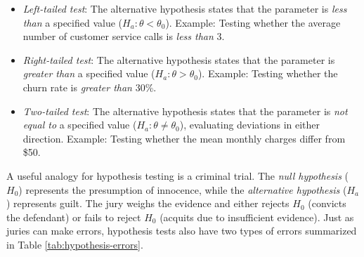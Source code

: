 \documentclass[
  11pt,
]{book}
\providecommand{\tightlist}{%
  \setlength{\itemsep}{0pt}\setlength{\parskip}{0pt}}
\theoremstyle{definition}
\theoremstyle{definition}
\theoremstyle{definition}
\theoremstyle{definition}
\theoremstyle{remark}
\begin{document}
\begin{itemize}
\tightlist
\item
  \emph{Left-tailed test}: The alternative hypothesis states that the parameter is \emph{less than} a specified value (\(H_a: \theta < \theta_0\)). Example: Testing whether the average number of customer service calls is \emph{less than} 3.\\
\item
  \emph{Right-tailed test}: The alternative hypothesis states that the parameter is \emph{greater than} a specified value (\(H_a: \theta > \theta_0\)). Example: Testing whether the churn rate is \emph{greater than} 30\%.\\
\item
  \emph{Two-tailed test}: The alternative hypothesis states that the parameter is \emph{not equal to} a specified value (\(H_a: \theta \neq \theta_0\)), evaluating deviations in either direction. Example: Testing whether the mean monthly charges differ from \$50.
\end{itemize}

A useful analogy for hypothesis testing is a criminal trial. The \emph{null hypothesis} (\(H_0\)) represents the presumption of innocence, while the \emph{alternative hypothesis} (\(H_a\)) represents guilt. The jury weighs the evidence and either rejects \(H_0\) (convicts the defendant) or fails to reject \(H_0\) (acquits due to insufficient evidence). Just as juries can make errors, hypothesis tests also have two types of errors summarized in Table \ref{tab:hypothesis-errors}.
\end{document}
